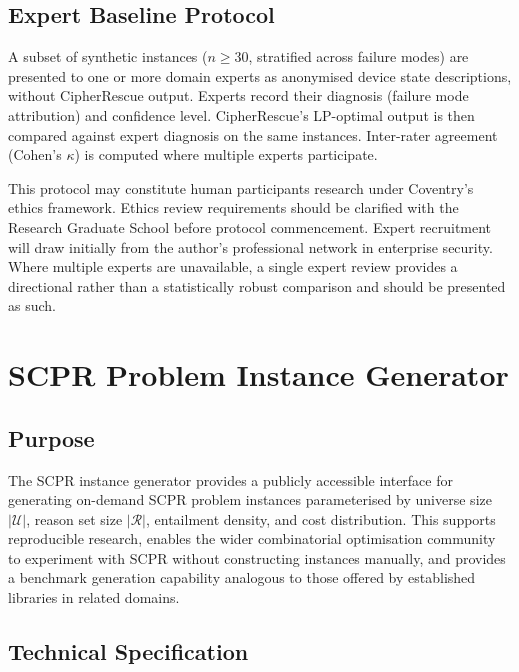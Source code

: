 \documentclass[11pt,a4paper]{report}
\newcommand{\calU}{\mathcal{U}}
\newcommand{\calR}{\mathcal{R}}
\begin{document}
\subsection{Expert Baseline Protocol}

A subset of synthetic instances ($n \geq 30$, stratified across failure modes) are
presented to one or more domain experts as anonymised device state descriptions, without
CipherRescue output. Experts record their diagnosis (failure mode attribution) and
confidence level. CipherRescue's LP-optimal output is then compared against expert
diagnosis on the same instances. Inter-rater agreement (Cohen's $\kappa$) is computed
where multiple experts participate.

\begin{tcolorbox}[enhanced, colback=lightamber!60, colframe=amber, arc=4pt,
  fonttitle=\bfseries, title={Ethics Review Note}]
This protocol may constitute human participants research under Coventry's ethics
framework. Ethics review requirements should be clarified with the Research Graduate
School before protocol commencement. Expert recruitment will draw initially from the
author's professional network in enterprise security. Where multiple experts are
unavailable, a single expert review provides a directional rather than a statistically
robust comparison and should be presented as such.
\end{tcolorbox}

\section{SCPR Problem Instance Generator}
\label{sec:empirical:generator}

\subsection{Purpose}

The SCPR instance generator provides a publicly accessible interface for generating
on-demand SCPR problem instances parameterised by universe size $|\calU|$, reason set
size $|\calR|$, entailment density, and cost distribution. This supports reproducible
research, enables the wider combinatorial optimisation community to experiment with SCPR
without constructing instances manually, and provides a benchmark generation capability
analogous to those offered by established libraries in related domains.

\subsection{Technical Specification}
\end{document}
